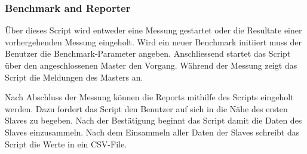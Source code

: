 \subsubsection{Benchmark and Reporter}\label{subsubsec:BenchmarkandReporter}
Über dieses Script wird entweder eine Messung gestartet oder die Resultate einer vorhergehenden Messung eingeholt.
Wird ein neuer Benchmark initiiert muss der Benutzer die Benchmark-Parameter angeben.
Anschliessend startet das Script über den angeschlossenen Master den Vorgang.
Während der Messung zeigt das Script die Meldungen des Masters an.

Nach Abschluss der Messung können die Reports mithilfe des Scripts eingeholt werden.
Dazu fordert das Script den Benutzer auf sich in die Nähe des ersten Slaves zu begeben.
Nach der Bestätigung beginnt das Script damit die Daten des Slaves einzusammeln.
Nach dem Einsammeln aller Daten der Slaves schreibt das Script die Werte in ein CSV-File. 



